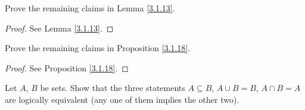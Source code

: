 \begin{exercise}\label{ex 3.1.3}
    Prove the remaining claims in Lemma \ref{3.1.13}.
\end{exercise}

\begin{proof}
    See Lemma \ref{3.1.13}.
\end{proof}

\begin{exercise}\label{ex 3.1.4}
    Prove the remaining claims in Proposition \ref{3.1.18}.
\end{exercise}

\begin{proof}
    See Proposition \ref{3.1.18}.
\end{proof}

\begin{exercise}\label{ex 3.1.5}
    Let \(A\), \(B\) be sets.
    Show that the three statements \(A \subseteq B\), \(A \cup B = B\), \(A \cap B = A\) are logically equivalent (any one of them implies the other two).
\end{exercise}

